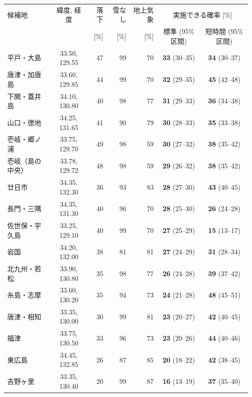 \begin{tabular}{lcrrrcc}
\toprule
候補地 & 緯度, 経度 & 落下 & 雪なし & 地上気象 & \multicolumn{2}{c}{実施できる確率 [\%]} \\
& & [\%] & [\%] & [\%] & 標準 (95\% 区間) & 短時間 (95\% 区間) \\
\midrule
平戸・大島 & 33.50, 129.55 & 47 & 99 & 70 & \textbf{33} (30--35) & \textbf{34} (30--37) \\
唐津・加唐島 & 33.60, 129.85 & 44 & 99 & 70 & \textbf{32} (29--35) & \textbf{45} (42--48) \\
下関・蓋井島 & 34.10, 130.80 & 40 & 98 & 77 & \textbf{31} (29--33) & \textbf{36} (34--38) \\
山口・徳地 & 34.25, 131.65 & 41 & 90 & 79 & \textbf{30} (28--33) & \textbf{35} (33--38) \\
壱岐・郷ノ浦 & 33.75, 129.70 & 49 & 98 & 59 & \textbf{30} (27--32) & \textbf{38} (35--42) \\
壱岐（島の中央） & 33.78, 129.72 & 48 & 98 & 59 & \textbf{29} (26--32) & \textbf{38} (35--42) \\
廿日市 & 34.35, 132.30 & 36 & 93 & 83 & \textbf{28} (27--30) & \textbf{43} (40--45) \\
長門・三隅 & 34.35, 131.30 & 40 & 96 & 70 & \textbf{28} (25--30) & \textbf{26} (24--28) \\
佐世保・宇久島 & 33.25, 129.10 & 40 & 99 & 70 & \textbf{27} (25--29) & \textbf{15} (13--17) \\
岩国 & 34.20, 132.00 & 38 & 81 & 81 & \textbf{27} (24--29) & \textbf{31} (28--34) \\
北九州・若松 & 33.90, 130.80 & 35 & 98 & 77 & \textbf{26} (24--28) & \textbf{39} (37--42) \\
糸島・志摩 & 33.60, 130.20 & 35 & 94 & 73 & \textbf{24} (21--28) & \textbf{48} (45--51) \\
唐津・相知 & 33.35, 130.00 & 30 & 99 & 81 & \textbf{23} (20--27) & \textbf{42} (40--45) \\
福津 & 33.75, 130.50 & 33 & 96 & 73 & \textbf{23} (20--26) & \textbf{44} (40--46) \\
東広島 & 34.45, 132.85 & 26 & 87 & 85 & \textbf{20} (18--22) & \textbf{42} (38--45) \\
吉野ヶ里 & 33.35, 130.40 & 20 & 99 & 87 & \textbf{16} (13--19) & \textbf{37} (35--40) \\
\bottomrule
\end{tabular}
